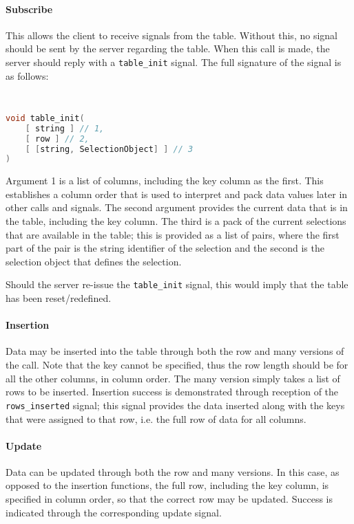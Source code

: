 \documentclass[11pt, oneside]{amsart}
\begin{document}
\paragraph{\textbf{Subscribe}} This allows the client to receive signals from the table. Without this, no signal should be sent by the server regarding the table. When this call is made, the server should reply with a \texttt{table\_init} signal. The full signature of the signal is as follows:

\lstinline[language=c++]|  | 

\begin{lstlisting}[language=c++]
void table_init( 
	[ string ] // 1, 
	[ row ] // 2, 
	[ [string, SelectionObject] ] // 3 
)
\end{lstlisting}

Argument 1 is a list of columns, including the key column as the first. This establishes a column order that is used to interpret and pack data values later in other calls and signals. The second argument provides the current data that is in the table, including the key column. The third is a pack of the current selections that are available in the table; this is provided as a list of pairs, where the first part of the pair is the string identifier of the selection and the second is the selection object that defines the selection.

Should the server re-issue the \texttt{table\_init} signal, this would imply that the table has been reset/redefined.

\paragraph{\textbf{Insertion}} Data may be inserted into the table through both the row and many versions of the call. Note that the key cannot be specified, thus the row length should be for all the other columns, in column order. The many version simply takes a list of rows to be inserted. Insertion success is demonstrated through reception of the \texttt{rows\_inserted} signal; this signal provides the data inserted along with the keys that were assigned to that row, i.e. the full row of data for all columns.

\paragraph{\textbf{Update}} Data can be updated through both the row and many versions. In this case, as opposed to the insertion functions, the full row, including the key column, is specified in column order, so that the correct row may be updated. Success is indicated through the corresponding update signal.
\end{document}
